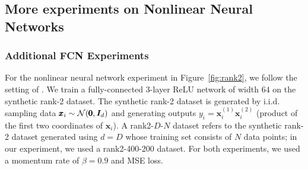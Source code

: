\subsection{More experiments on Nonlinear Neural Networks}
\label{app:modern}

\subsubsection{Additional FCN Experiments}
For the nonlinear neural network experiment in Figure~\ref{fig:rank2}, we follow the setting of \citet{zhu2023catapult}.
We train a fully-connected 3-layer ReLU network of width $64$ on the synthetic rank-2 dataset.
The synthetic rank-2 dataset is generated by i.i.d. sampling data $\pmb{x}_i \sim \mathcal{N}(\pmb{0}, {\bm{I}}_{d})$ and generating outputs $y_i = \pmb{x}_i^{(1)} \pmb{x}_i^{(2)}$ (product of the first two coordinates of $\pmb{x}_i$).
A rank2-$D$-$N$ dataset refers to the synthetic rank-2 dataset generated using $d=D$ whose training set consists of $N$ data points; in our experiment, we used a rank2-400-200 dataset.
For both experiments, we used a momentum rate of $\beta=0.9$ and MSE loss. \\

